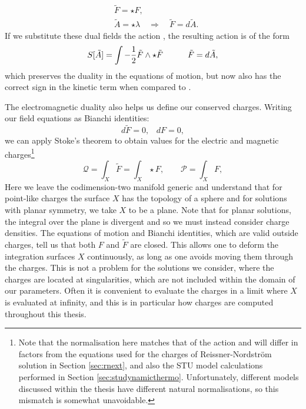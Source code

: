\begin{equation}
	\begin{aligned}
		&\tilde{F} = \star F, \\
		&\tilde{A} = \star \lambda \quad \Rightarrow \quad \tilde{F} = d\tilde{A}  .
	\end{aligned}
\end{equation}
If we substitute these dual fields the action , the resulting action is of the form
\begin{equation}
S[\tilde{A}] =  \int - \frac{1}{2} \tilde{F} \wedge \star \tilde{F} \quad \qquad \tilde{F} = d\tilde{A},
\end{equation}
which preserves the duality in the equations of motion, but now also  has the correct sign in the kinetic term when compared to . 

The electromagnetic duality also helps us define our conserved charges. Writing our field equations as Bianchi identities:
\begin{equation}
d \tilde{F}=0,\;\;\;dF = 0,
\end{equation}
we can apply Stoke's theorem to obtain values for the electric and magnetic charges\footnote{Note that the normalisation here matches that of the action  and will differ in factors from the equations used for the charges of Reissner-Nordstr\"om solution in Section \ref{sec:rnext}, and also the STU model calculations performed in Section \ref{sec:studynamicthermo}. Unfortunately, different models discussed within the thesis have different natural normalisations, so this mismatch is somewhat unavoidable.}
\begin{equation}
\label{charges}
\mathcal{Q} =  \int_X \tilde{F}  =  \int_X  \star F, \qquad
\mathcal{P} =  \int_X F,
\end{equation}
Here we leave the codimension-two manifold generic and understand that for point-like charges the surface $X$ has the topology of a sphere and for solutions with planar symmetry, we take $X$ to be a plane. Note that for planar solutions, the integral over the plane is divergent and so we must instead consider charge densities. The equations of motion and Bianchi identities, which are valid outside charges, tell us that both $F$ and $\tilde{F}$ are closed. This allows one to deform the integration surfaces $X$ continuously, as long as one avoids moving them through the charges. This is not a problem for the solutions we consider, where the charges are located at singularities, which are not included within the domain of our parameters. Often it is convenient to evaluate the charges in a limit where $X$ is evaluated at infinity, and this is in particular how charges are computed throughout this thesis.

